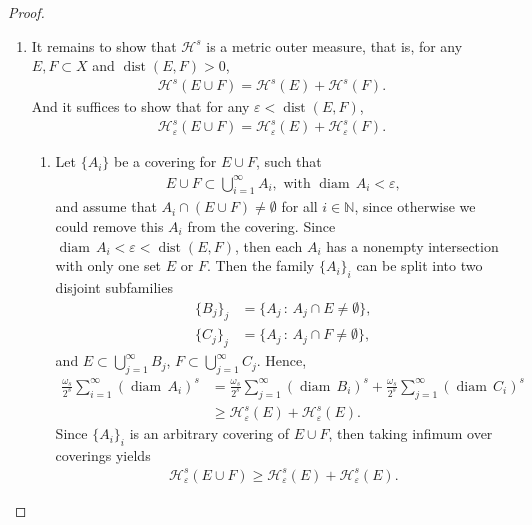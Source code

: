 \documentclass[11pt]{book}
\theoremstyle{definition}
\numberwithin{equation}{chapter}
\def\diam{{\operatorname{diam}\,}}
\begin{document}
\begin{proof}
\begin{enumerate}[label=(\alph*)]
    \item 
    It remains to show that $\mathcal{H}^s$ is a metric outer measure, that is, for any $E, F \subset X$ and $\operatorname{dist}(E,F) > 0$, \begin{align*}
        \mathcal{H}^s(E \cup F) = \mathcal{H}^s(E) + \mathcal{H}^s(F).
    \end{align*}
    And it suffices to show that for any $\varepsilon < \operatorname{dist}(E,F)$,
    \begin{align*}
        \mathcal{H}^s_\varepsilon(E \cup F) = \mathcal{H}^s_\varepsilon(E) + \mathcal{H}^s_\varepsilon(F).
    \end{align*}
    
    \begin{enumerate}[label=\arabic*)]
        \item Let $\{A_i\}$ be a covering for $E \cup F$, such that
        \begin{align*}
            E \cup F \subset \bigcup^\infty_{i=1} A_i, \,\, \text{with} \,\, \diam A_i < \varepsilon,
        \end{align*}
        and assume that $A_i \cap (E \cup F) \neq \emptyset$ for all $i \in \mathbb{N}$, since otherwise we could remove this $A_i$ from the covering. Since $\diam A_i < \varepsilon < \operatorname{dist}(E,F)$, then each $A_i$ has a nonempty intersection with only one set $E$ or $F$. Then the family $\{A_i\}_i$ can be split into two disjoint subfamilies
        \begin{align*}
            \{B_j\}_j & = \{A_j\, :\, A_j \cap E \neq \emptyset\}, \\
            \{C_j\}_j & = \{A_j\, :\, A_j \cap F \neq \emptyset\},
        \end{align*}
        and $E \subset \bigcup^\infty_{j=1} B_j$, $F \subset \bigcup^\infty_{j=1} C_j$. Hence,
        \begin{align*}
            \frac{\omega_s}{2^s} \sum^\infty_{i=1} \left(\diam A_i\right)^s & = \frac{\omega_s}{2^s} \sum^\infty_{j=1} \left(\diam B_i\right)^s + \frac{\omega_s}{2^s} \sum^\infty_{j=1} \left(\diam C_i\right)^s \\
            & \geq \mathcal{H}^s_\varepsilon(E) + \mathcal{H}^s_\varepsilon(E).
        \end{align*}
        Since $\{A_i\}_i$ is an arbitrary covering of $E \cup F$, then taking infimum over coverings yields
        \begin{align*}
            \mathcal{H}^s_\varepsilon(E \cup F) \geq \mathcal{H}^s_\varepsilon(E) + \mathcal{H}^s_\varepsilon(E).
        \end{align*}
        

\end{enumerate}
\end{enumerate}
\end{proof}
\end{document}
